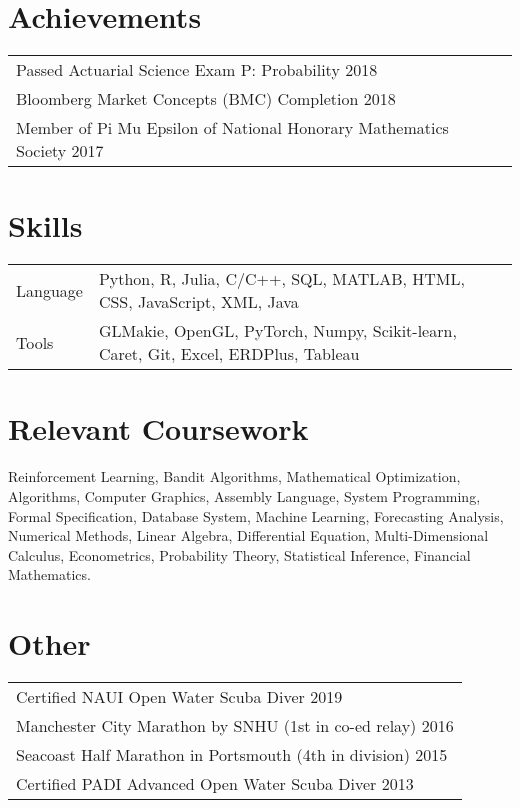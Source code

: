 \documentclass[a4paper,12pt]{article}
\begin{document}
\section{Achievements}
\begin{tabularx}{\linewidth}{@{} X@{}}	
Passed Actuarial Science Exam P: Probability \hfill 2018 \\

Bloomberg Market Concepts (BMC) Completion \hfill 2018 \\ 

Member of Pi Mu Epsilon of National Honorary Mathematics Society \hfill  2017 \\
\end{tabularx}


\section{Skills}
\begin{tabularx}{\linewidth}{@{}l X@{}}
Language &  \normalsize{Python, R, Julia, C/C++, SQL, MATLAB, HTML, CSS, JavaScript, XML, Java}\\
Tools  &  \normalsize{GLMakie, OpenGL, PyTorch, Numpy, Scikit-learn, Caret, Git, Excel, ERDPlus, Tableau}\\  
\end{tabularx}

\section{Relevant Coursework}
Reinforcement Learning, Bandit Algorithms, Mathematical Optimization, Algorithms, Computer Graphics, Assembly Language, System Programming, Formal Specification, Database System, Machine Learning, Forecasting Analysis, Numerical Methods, Linear Algebra, Differential Equation, Multi-Dimensional Calculus, Econometrics, Probability Theory, Statistical Inference, Financial Mathematics.

\section{Other}
\begin{tabularx}{\linewidth}{@{} X@{}}	

Certified NAUI Open Water Scuba Diver \hfill  2019 \\
Manchester City Marathon by SNHU (1st in co-ed relay) \hfill 2016 \\
Seacoast Half Marathon in Portsmouth (4th in division) \hfill 2015 \\
Certified PADI Advanced Open Water Scuba Diver \hfill  2013 \\

\end{tabularx}
\end{document}
